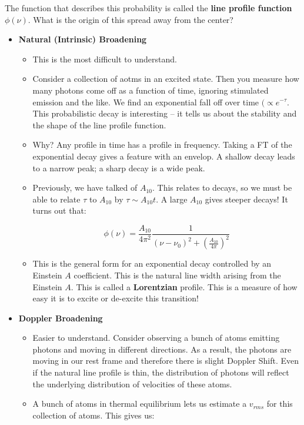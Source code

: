 \documentclass{article}
\begin{document}
The function that describes this probability is called the \textbf{line profile function} $\phi(\nu)$. What is the origin of this spread away from the center?

\begin{itemize}
    \item \textbf{Natural (Intrinsic) Broadening}
    \begin{itemize}
        \item This is the most difficult to understand. 
        \item Consider a collection of aotms in an excited state. Then you measure how many photons come off as a function of time, ignoring stimulated emission and the like. We find an exponential fall off over time $(\propto e^{-\tau}$. This probabilistic decay is interesting -- it tells us about the stability and the shape of the line profile function. 
        \item Why? Any profile in time has a profile in frequency. Taking a FT of the exponential decay gives a feature with an envelop. A shallow decay leads to a narrow peak; a sharp decay is a wide peak.
        \item Previously, we have talked of $A_{10}$. This relates to decays, so we must be able to relate $\tau$ to $A_{10}$ by $\tau \sim A_{10} t$. A large $A_{10}$ gives steeper decays! It turns out that:
        
        \begin{equation}
            \boxed{\phi(\nu) = \frac{A_{10}}{4\pi^2} \frac{1}{\left(\nu - \nu_0\right)^2 + \left(\frac{A_{10}}{4\pi}\right)^2}}
        \end{equation}
        
        \item This is the general form for an exponential decay controlled by an Einstein $A$ coefficient. This is the natural line width arising from the Einstein $A$. This is called a \textbf{Lorentzian} profile. This is a measure of how easy it is to excite or de-excite this transition!
    \end{itemize}
    \item \textbf{Doppler Broadening}
    \begin{itemize}
        \item Easier to understand. Consider observing a bunch of atoms emitting photons and moving in different directions. As a result, the photons are moving in our rest frame and therefore there is slight Doppler Shift. Even if the natural line profile is thin, the distribution of photons will reflect the underlying distribution of velocities of these atoms. 
        \item A bunch of atoms in thermal equilibrium lets us estimate a $v_{rms}$ for this collection of atoms. This gives us:
        

\end{itemize}
\end{itemize}
\end{document}

